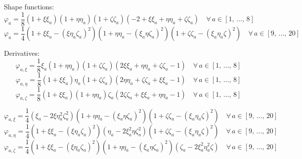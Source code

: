 \documentclass[12pt]{article}
\begin{document}
\maketitle

Shape functions:
\begin{equation}
	\varphi_{a} = \frac{1}{8} (1 + \xi \xi_a) (1 + \eta \eta_a) (1 + \zeta \zeta_a) ( -2 + \xi \xi_a + \eta \eta_a + \zeta \zeta_a ) \quad \forall \, a \in \left[ 1, \, \ldots , \, 8 \right]
\end{equation}
\begin{equation}
	\varphi_{a} = \frac{1}{4} (1 + \xi \xi_a - (\xi \eta_a \zeta_a)^2) (1 + \eta \eta_a - (\xi_a \eta \zeta_a)^2) (1 + \zeta \zeta_a - (\xi_a \eta_a \zeta)^2) \quad \forall \, a \in \left[ 9, \, \ldots , \, 20 \right]
\end{equation}

Derivatives:
\begin{equation}
	\varphi_{a,\xi} = \frac{1}{8} \xi_a (1 + \eta \eta_a) (1 + \zeta \zeta_a) ( 2 \xi \xi_a + \eta \eta_a + \zeta \zeta_a - 1 ) \quad \forall \, a \in \left[ 1, \, \ldots , \, 8 \right]
\end{equation}
\begin{equation}
	\varphi_{a,\eta} = \frac{1}{8} (1 + \xi \xi_a) \eta_a (1 + \zeta \zeta_a) ( 2 \eta \eta_a + \zeta \zeta_a + \xi \xi_a - 1 ) \quad \forall \, a \in \left[ 1, \, \ldots , \, 8 \right]
\end{equation}
\begin{equation}
	\varphi_{a,\zeta} = \frac{1}{8} (1 + \xi \xi_a) (1 + \eta \eta_a) \zeta_a ( 2 \zeta \zeta_a + \xi \xi_a + \eta \eta_a - 1 ) \quad \forall \, a \in \left[ 1, \, \ldots , \, 8 \right]
\end{equation}


\begin{equation}
	\varphi_{a,\xi} = \frac{1}{4} (\xi_a - 2 \xi \eta_a^2 \zeta_a^2) (1 + \eta \eta_a - (\xi_a \eta \zeta_a)^2) (1 + \zeta \zeta_a - (\xi_a \eta_a \zeta)^2) \quad \forall \, a \in \left[ 9, \, \ldots , \, 20 \right]
\end{equation}
\begin{equation}
	\varphi_{a,\eta} = \frac{1}{4} (1 + \xi \xi_a - (\xi \eta_a \zeta_a)^2) (\eta_a - 2 \xi_a^2 \eta \zeta_a^2) (1 + \zeta \zeta_a - (\xi_a \eta_a \zeta)^2) \quad \forall \, a \in \left[ 9, \, \ldots , \, 20 \right]
\end{equation}
\begin{equation}
	\varphi_{a,\zeta} = \frac{1}{4} (1 + \xi \xi_a - (\xi \eta_a \zeta_a)^2) (1 + \eta \eta_a - (\xi_a \eta \zeta_a)^2) (\zeta_a - 2 \xi_a^2 \eta_a^2 \zeta) \quad \forall \, a \in \left[ 9, \, \ldots , \, 20 \right]
\end{equation}
\end{document}
